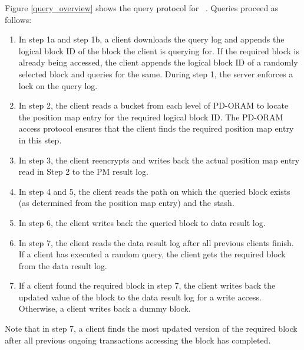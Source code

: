 Figure \ref{query_overview} shows the query protocol for \sysname~. Queries proceed as follows: 
\begin{enumerate}
 \item In step 1a and step 1b, a client downloads the query log and appends the logical block ID of the block the client is querying for. If the required block 
 is already being accessed, the client appends the logical block ID of a randomly selected block and queries for the same. During step 1, the server enforces a 
 lock on the query log.
 \item In step 2, the client reads a bucket from each level of PD-ORAM to locate the position map entry for the required logical block ID. The PD-ORAM access protocol 
 ensures that the client finds the required position map entry in this step. 
 \item In step 3, the client reencrypts and writes back the actual position map entry read in Step 2 to the PM result log.
 \item In step 4 and 5, the client reads the path on which the queried block exists (as determined from the position map entry) and the stash. 
 \item In step 6, the client writes back the queried block to data result log.
 \item In step 7, the client reads the data result log after all previous clients finish. If a client has executed 
 a random query, the client gets the required block from the data result log. 
 \item If a client found the required block in step 7, the client writes back the updated value of the block to the 
 data result log for a write access. Otherwise, a client writes back a dummy block.
\end{enumerate}

Note that in step 7, a client finds the most updated version of the 
required block after all previous ongoing transactions accessing the block has completed. 

